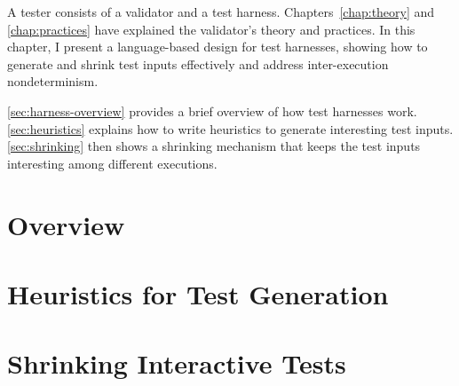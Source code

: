 A tester consists of a validator and a test harness.  Chapters~\ref{chap:theory}
and \ref{chap:practices} have explained the validator's theory and practices.
In this chapter, I present a language-based design for test harnesses, showing
how to generate and shrink test inputs effectively and address inter-execution
nondeterminism.

\autoref{sec:harness-overview} provides a brief overview of how test harnesses
work.  \autoref{sec:heuristics} explains how to write heuristics to generate
interesting test inputs.  \autoref{sec:shrinking} then shows a shrinking
mechanism that keeps the test inputs interesting among different executions.

\section{Overview}
\label{sec:harness-overview}


\section{Heuristics for Test Generation}
\label{sec:heuristics}


\section{Shrinking Interactive Tests}
\label{sec:shrinking}

